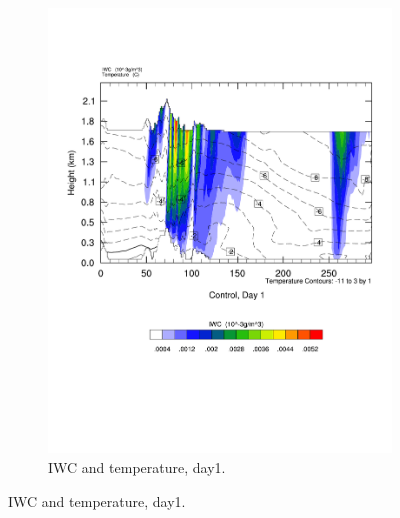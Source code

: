 \begin{figure}
\begin{subfigure}{0.48\textwidth}
        \includegraphics[width=\textwidth]{results/control/crossSec_IWC_Control_Day1.pdf}
        \caption{IWC and temperature, day1.}
        \label{subfig:cross_IWC_day1}
    \end{subfigure}
    

\end{figure}
